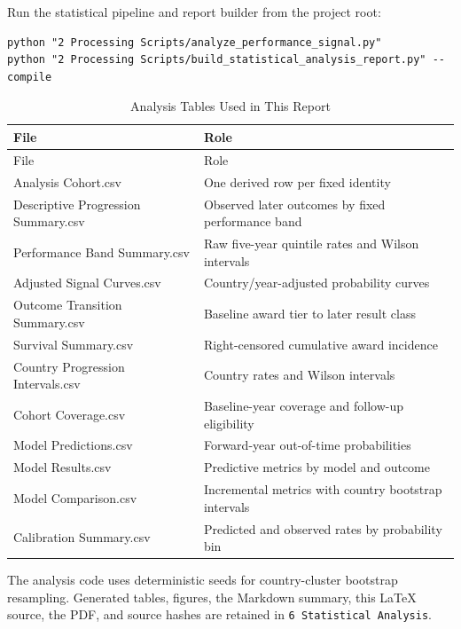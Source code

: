 \documentclass[11pt]{article}
\begin{document}
Run the statistical pipeline and report builder from the project root:

\begin{verbatim}
python "2 Processing Scripts/analyze_performance_signal.py"
python "2 Processing Scripts/build_statistical_analysis_report.py" --compile
\end{verbatim}

\begin{longtable}{p{}p{}}
\caption{Analysis Tables Used in This Report}\\
\toprule
File & Role \\
\midrule
\endfirsthead
\toprule
File & Role \\
\midrule
\endhead
Analysis Cohort.csv & One derived row per fixed identity \\
Descriptive Progression Summary.csv & Observed later outcomes by fixed performance band \\
Performance Band Summary.csv & Raw five-year quintile rates and Wilson intervals \\
Adjusted Signal Curves.csv & Country/year-adjusted probability curves \\
Outcome Transition Summary.csv & Baseline award tier to later result class \\
Survival Summary.csv & Right-censored cumulative award incidence \\
Country Progression Intervals.csv & Country rates and Wilson intervals \\
Cohort Coverage.csv & Baseline-year coverage and follow-up eligibility \\
Model Predictions.csv & Forward-year out-of-time probabilities \\
Model Results.csv & Predictive metrics by model and outcome \\
Model Comparison.csv & Incremental metrics with country bootstrap intervals \\
Calibration Summary.csv & Predicted and observed rates by probability bin \\
\bottomrule
\end{longtable}

The analysis code uses deterministic seeds for country-cluster bootstrap resampling. Generated tables, figures, the Markdown summary, this LaTeX source, the PDF, and source hashes are retained in \texttt{6 Statistical Analysis}.
\end{document}

